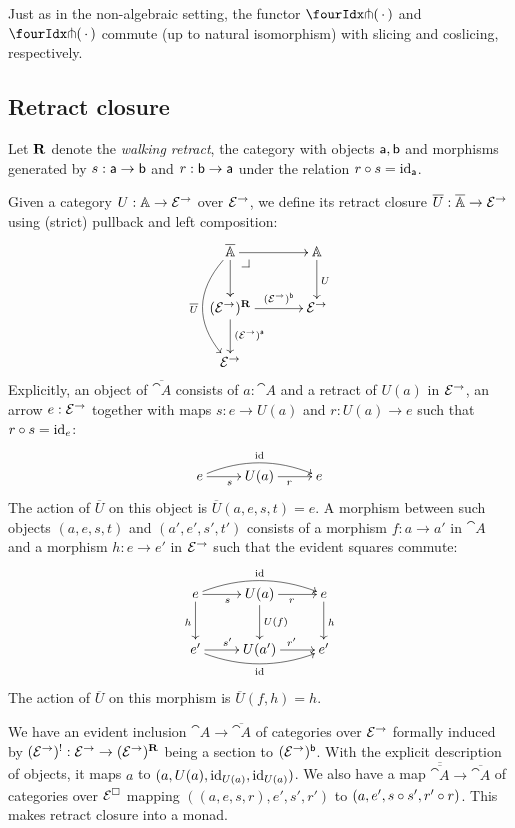 \documentclass[reqno,10pt,a4paper,oneside]{amsart}
\begin{document}
\begin{remark}
\label{pitchfork-slicing}
Just as in the non-algebraic setting, the functor $\liftr{\brarghole}$ and $\liftl{\brarghole}$ commute (up to natural isomorphism) with slicing and coslicing, respectively.
\end{remark}

\subsection{Retract closure}

Let $\mathbf{R}$ denote the \emph{walking retract}, \ie the category with objects $\mathsf{a}, \mathsf{b}$ and morphisms generated by $s : \mathsf{a} \to \mathsf{b}$ and $r : \mathsf{b} \to \mathsf{a}$ under the relation $r \mathbin{\circ} s = \operatorname{id}_{\mathsf{a}}$.

Given a category $U : \mathbb{A} \to \mathcal{E}^{\to}$ over $\mathcal{E}^{\to}$, we define its retract closure $\overline{U} : \overline{\mathbb{A}} \to \mathcal{E}^{\to}$ using (strict) pullback and left composition:
\[
\xymatrix@C+1em{
  \overline{\cat{A}}
  \ar[r]
  \ar[d]
  \ar@/_2em/[dd]_{\overline{U}}
  \pullback{dr}
&
  \cat{A}
  \ar[d]^{U}
\\
  (\catE^{\to})^{\ret}
  \ar[r]^-{(\catE^{\to})^{\retB}}
  \ar[d]^{(\catE^{\to})^{\retA}}
&
  \catE^{\to}
\\
  \catE^{\to}
}
\]
Explicitly, an object of $\overline{\cat{A}}$ consists of $a : \cat{A}$ and a retract of $U(a)$ in $\mathcal{E}^{\to}$, \ie an arrow $e : \mathcal{E}^{\to}$ together with maps $s : e \to U(a)$ and $r : U(a) \to e$ such that $r \mathbin{\circ} s = \operatorname{id}_e$:
\[
\xymatrix{
  e
  \ar[r]_{s}
  \ar@/^1em/[rr]^{\id}
&
  U(a)
  \ar[r]_{r}
&
  e
}
\]
The action of $\overline{U}$ on this object is $\overline{U}(a, e, s, t) = e$.
A morphism between such objects $(a, e, s, t)$ and $(a', e', s', t')$ consists of a morphism $f : a \to a'$ in $\cat{A}$ and a morphism $h : e \to e'$ in $\mathcal{E}^{\to}$ such that the evident squares commute:
\[
\xymatrix{
  e
  \ar[r]_{s}
  \ar@/^1em/[rr]^{\id}
  \ar[d]_{h}
&
  U(a)
  \ar[r]_{r}
  \ar[d]^{U(f)}
&
  e
  \ar[d]^{h}
\\
  e'
  \ar[r]^{s'}
  \ar@/_1em/[rr]_{\id}
&
  U(a')
  \ar[r]^{r'}
&
  e'
}
\]
The action of $\overline{U}$ on this morphism is $\overline{U}(f, h) = h$.

We have an evident inclusion $\cat{A} \to \overline{\cat{A}}$ of categories over $\mathcal{E}^{\to}$ formally induced by $(\mathcal{E}^{\to})^{\mathord{!}} : \mathcal{E}^{\to} \to (\mathcal{E}^{\to})^{\mathbf{R}}$ being a section to $(\mathcal{E}^{\to})^{\mathsf{b}}$.
With the explicit description of objects, it maps $a$ to $(a, U(a), \operatorname{id}_{U(a)}, \operatorname{id}_{U(a)})$.
We also have a map $\overline{\overline{\cat{A}}} \to \overline{\cat{A}}$ of categories over $\mathcal{E}^{\Box}$ mapping $((a, e, s, r), e', s', r')$ to $(a, e', s \mathbin{\circ} s', r' \mathbin{\circ} r)$.
This makes retract closure into a monad.
\end{document}
